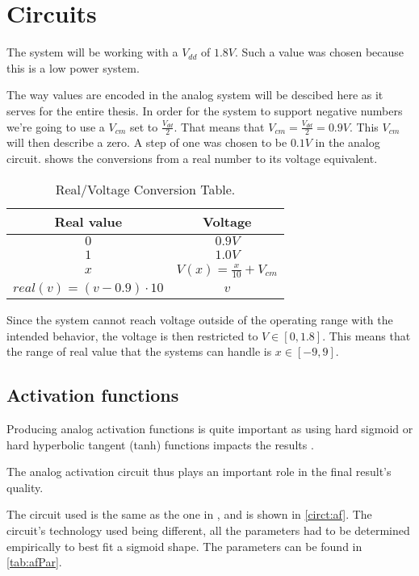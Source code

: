 \section{Circuits}

The system will be working with a $V_{dd}$ of $1.8V$. Such a value was chosen because this is a low power system.

The way values are encoded in the analog system will be descibed here as it serves for the entire thesis.
In order for the system to support negative numbers we're going to use a $V_{cm}$ set to $\frac{V_{dd}}{2}$. That means that $V_{cm}=\frac{V_{dd}}{2}=0.9V$. This $V_{cm}$ will then describe a zero. A step of one was chosen to be $0.1V$ in the analog circuit.
 shows the conversions from a real number to its voltage equivalent.

\begin{table}[b]
  \caption{Real/Voltage Conversion Table.}
  \label{tab:valConv}
  \centering
  \begin{tabular}{|c|c|}
    \hline
    \textbf{Real value} & \textbf{Voltage} \\
    \hline
    $0$ & $0.9V$ \\
    \hline
    $1$ & $1.0V$ \\
    \hline
    $x$ & $V(x)=\frac{x}{10}+V_{cm}$\\
    \hline
    $real(v)=(v-0.9)\cdot 10$ & $v$\\
    \hline
  \end{tabular}
\end{table}

Since the system cannot reach voltage outside of the operating range with the intended behavior, the voltage is then restricted to $V\in [0,1.8]$. This means that the range of real value that the systems can handle is $x\in [-9,9]$.

\subsection{Activation functions}\label{subsec:af}

Producing analog activation functions is quite important as using hard sigmoid or hard hyperbolic tangent (tanh) functions impacts the results \cite{af,hardSigm}.

The analog activation circuit thus plays an important role in the final result's quality.

The circuit used is the same as the one in \cite{thesisRef}, and is shown in \cref{circt:af}. The circuit's technology used being different, all the parameters had to be determined empirically to best fit a sigmoid shape. The parameters can be found in \cref{tab:afPar}.

